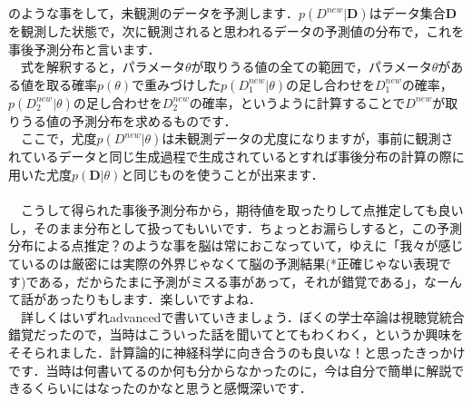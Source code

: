 \documentclass[11pt,a4paper]{ujreport} 	%
\begin{document}
のような事をして，未観測のデータを予測します．$p(D^{new}|\mathbf{D})$はデータ集合$\mathbf{D}$を観測した状態で，次に観測されると思われるデータの予測値の分布で，これを事後予測分布と言います．\\
　式を解釈すると，パラメータ$\theta$が取りうる値の全ての範囲で，パラメータ$\theta$がある値を取る確率$p(\theta)$で重みづけした$p(D^{new}_1|\theta)$の足し合わせを$D^{new}_1$の確率，$p(D^{new}_2|\theta)$の足し合わせを$D^{new}_2$の確率，というように計算することで$D^{new}$が取りうる値の予測分布を求めるものです．\\
　ここで，尤度$p(D^{new}|\theta)$は未観測データの尤度になりますが，事前に観測されているデータと同じ生成過程で生成されているとすれば事後分布の計算の際に用いた尤度$p(\mathbf{D}|\theta)$と同じものを使うことが出来ます．\\
\\
　こうして得られた事後予測分布から，期待値を取ったりして点推定しても良いし，そのまま分布として扱ってもいいです．ちょっとお漏らしすると，この予測分布による点推定？のような事を脳は常におこなっていて，ゆえに「我々が感じているのは厳密には実際の外界じゃなくて脳の予測結果(*正確じゃない表現です)である，だからたまに予測がミスる事があって，それが錯覚である」，なーんて話があったりもします．楽しいですよね．\\
　詳しくはいずれadvancedで書いていきましょう．ぼくの学士卒論は視聴覚統合錯覚だったので，当時はこういった話を聞いてとてもわくわく，というか興味をそそられました．計算論的に神経科学に向き合うのも良いな！と思ったきっかけです．当時は何書いてるのか何も分からなかったのに，今は自分で簡単に解説できるくらいにはなったのかなと思うと感慨深いです．\\
\end{document}
